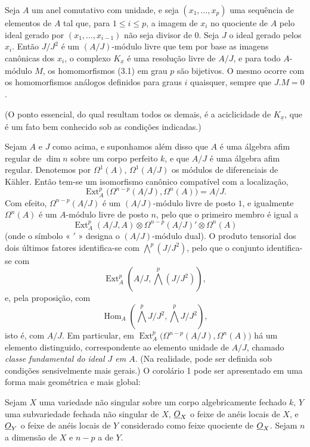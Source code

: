  Seja $A$ um anel comutativo com unidade, e seja
$(x_1,\ldots,x_p)$ uma sequência de elementos de $A$ tal que, para $1\leq i\leq p$,
a imagem de $x_i$ no quociente de $A$ pelo ideal gerado por
$(x_1,\ldots,x_{i-1})$ não seja divisor de $0$. Seja $J$ o ideal gerado
pelos $x_i$. Então $J/J^{2}$ é um $(A/J)$-módulo livre que tem por base as
imagens canônicas dos $x_i$, o complexo $K_{\underline{x}}$ é uma resolução
livre de $A/J$, e para todo $A$-módulo $M$, os homomorfismos (3.1) em
grau $p$ são bijetivos. O mesmo ocorre com os homomorfismos análogos
definidos para graus $i$ quaisquer, sempre que $J.M=0$.

(O ponto essencial, do qual resultam todos os demais, é a aciclicidade de
$K_{\underline{x}}$, que é um fato bem conhecido sob as condições indicadas.)

 Sejam $A$ e $J$ como acima, e suponhamos além disso que
$A$ é uma álgebra afim regular de $\dim n$ sobre um corpo perfeito $k$, e
que $A/J$ é uma álgebra afim regular. Denotemos por $\Omega^{1}(A)$,
$\Omega^{1}(A/J)$ os módulos de diferenciais de Kähler. Então tem-se um
isomorfismo canônico compatível com a localização,
\begin{equation}\tag{3.5}
  \operatorname{Ext}_{A}^{p}\bigl(\Omega^{n-p}(A/J),\Omega^{n}(A)\bigr)=A/J.
\end{equation}
Com efeito, $\Omega^{n-p}(A/J)$ é um $(A/J)$-módulo livre de posto $1$, e igualmente
$\Omega^{n}(A)$ é um $A$-módulo livre de posto $n$,
pelo que o primeiro membro é igual a
\[
  \operatorname{Ext}_{A}^{p}(A/J,A)
  \otimes\Omega^{n-p}(A/J)'\otimes\Omega^{n}(A)
\]
(onde o símbolo « $'$ » designa o $(A/J)$-módulo dual). O produto tensorial dos
dois últimos fatores identifica-se com $\bigwedge^{p}(J/J^{2})$, pelo que o conjunto
identifica-se com
\[
  \operatorname{Ext}_{A}^{p}\!\left(A/J,\bigwedge^{p}(J/J^{2})\right),
\]
e, pela proposição, com
\[
  \operatorname{Hom}_{A}\!\left(\bigwedge^{p}J/J^{2},
  \bigwedge^{p}J/J^{2}\right),
\]
isto é, com $A/J$. Em particular, em
$\operatorname{Ext}_{A}^{p}\bigl(\Omega^{n-p}(A/J),\Omega^{n}(A)\bigr)$ há um
elemento distinguido, correspondente ao elemento unidade de $A/J$, chamado
\emph{classe fundamental do ideal $J$ em $A$}. (Na realidade, pode
ser definida sob condições sensivelmente mais gerais.) O
corolário 1 pode ser apresentado em uma forma mais geométrica e mais global:

 Sejam $X$ uma variedade não singular sobre um corpo
algebricamente fechado $k$, $Y$ uma subvariedade fechada não singular de $X$,
$\underline{O}_X$ o feixe de anéis locais de $X$, e $\underline{O}_Y$ o feixe de anéis
locais de $Y$ considerado como feixe quociente de $\underline{O}_X$. Sejam $n$ a
dimensão de $X$ e $n-p$ a de $Y$.

